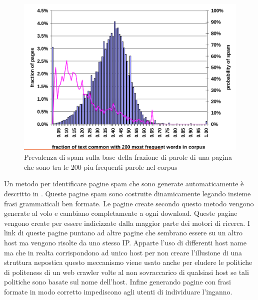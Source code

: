 \begin{figure}[htbp]
\centering
\includegraphics[width=12cm]{immagini/fetterly/fetterly9}
\caption{Prevalenza di spam sulla base della frazione di parole di una pagina che sono tra le 200 piu frequenti parole nel corpus}
\label{fig:fetterly9}
\end{figure}

Un metodo per identificare pagine spam che sono generate automaticamente è descritto in \cite{Fetterly:2005:DPD:1076034.1076066}. Queste pagine spam sono  costruite dinamicamente legando insieme frasi grammaticali ben formate. Le pagine create secondo questo metodo vengono generate al volo e cambiano completamente a ogni download. Queste pagine vengono create per essere indicizzate dalla maggior parte dei motori di ricerca. I link di queste pagine puntano ad altre pagine che sembrano essere su un altro host ma vengono risolte da uno stesso IP. Apparte l'uso di differenti host name ma che in realta corrispondono ad unico host per non creare l'illusione di una struttura nepostica questo meccanismo viene usato anche per eludere le politiche di politeness di un web crawler volte al non sovraccarico di qualsiasi host se tali politiche sono basate sul nome dell'host. Infine generando pagine con frasi formate in modo corretto impediscono agli utenti di individuare l'inganno.

